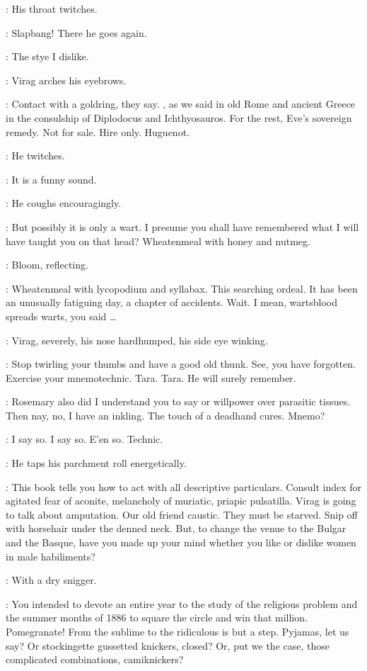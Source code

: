 :
His throat twitches.

\Virag:
Slapbang!
There he goes again.

\Bloom:
The stye I dislike.

:
Virag arches his eyebrows.

\Virag:
Contact with a goldring,
they say.
,
as we said in old Rome and ancient Greece
in the consulship of Diplodocus and Ichthyosauros.
For the rest,
Eve's sovereign remedy.
Not for sale.
Hire only.
Huguenot.

:
He twitches.

\Virag:
It is a funny sound.

:
He coughs encouragingly.

\Virag:
But possibly it is only a wart.
I presume you shall have remembered what I will have taught you on that head?
Wheatenmeal with honey and nutmeg.

:
Bloom,
reflecting.

\Bloom:
Wheatenmeal with lycopodium and syllabax.
This searching ordeal.
It has been an unusually fatiguing day,
a chapter of accidents.
Wait.
I mean,
wartsblood spreads warts,
you said \ldots

:
Virag,
severely,
his nose hardhumped,
his side eye winking.

\Virag:
Stop twirling your thumbs and have a good old thunk.
See,
you have forgotten.
Exercise your mnemotechnic.
Tara.
Tara.
He will surely remember.

\Bloom:
Rosemary also did I understand you to say or willpower over parasitic tissues.
Then nay,
no,
I have an inkling.
The touch of a deadhand cures.
Mnemo?%

\Virag:
I say so.
I say so.
E'en so.
Technic.

:
He taps his parchment roll energetically.

\Virag:
This book tells you how to act with all descriptive particulars.
Consult index for agitated fear of aconite,
melancholy of muriatic,
priapic pulsatilla.
Virag is going to talk about amputation.
Our old friend caustic.
They must be starved.
Snip off with horsehair under the denned neck.
But,
to change the venue to the Bulgar and the Basque,
have you made up your mind
whether you like or dislike women in male habiliments?

:
With a dry snigger.

\Virag:
You intended to devote an entire year to the study
of the religious problem and the summer months of 1886
to square the circle and win that million.
Pomegranate!
From the sublime to the ridiculous is but a step.
Pyjamas,
let us say?
Or stockingette gussetted knickers,
closed?
Or,
put we the case,
those complicated combinations,
camiknickers?

